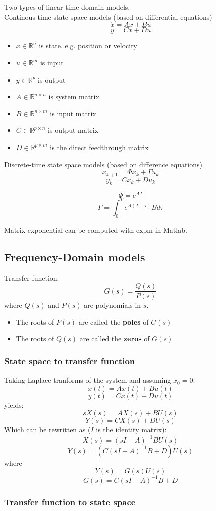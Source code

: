 Two types of linear time-domain models. \\
Continous-time state space models
(based on differential equations)
$$\dot{x} = Ax+Bu$$
$$y=Cx+Du$$
\begin{itemize}
	\item $x\in \mathbb{R}^n$ is state. e.g. position or velocity
	\item $u\in \mathbb{R}^m$ is input
	\item $y\in \mathbb{R}^p$ is output
	\item $A\in \mathbb{R}^{n\times n}$ is system matrix
	\item $B\in \mathbb{R}^{n\times m}$ is input matrix
	\item $C\in \mathbb{R}^{p\times n}$ is output matrix
	\item $D\in \mathbb{R}^{p\times m}$ is the direct feedthrough matrix
\end{itemize}
Discrete-time state space models (based on difference equations)
$$x_{k+1} = \Phi x_k + \Gamma u_k$$
$$y_k = Cx_k + Du_k$$

$$\Phi = e^{AT}$$
$$\Gamma = \int_0^T e^{A(T-\tau)}B d\tau$$

Matrix exponential can be computed with expm in Matlab.


\subsection{Frequency-Domain models}
Transfer function:
$$G(s)=\frac{Q(s)}{P(s)}$$
where $Q(s)$ and $P(s)$ are polynomials in $s$.
\begin{itemize}
	\item The roots of $P(s)$ are called the \textbf{poles} of $G(s)$
	\item The roots of $Q(s)$ are called the \textbf{zeros} of $G(s)$
\end{itemize}
\subsubsection{State space to transfer function}
Taking Laplace tranforms of the system and assuming $x_0=0$:
$$\dot{x}(t)=Ax(t)+Bu(t)$$
$$y(t)=Cx(t)+Du(t)$$
yields:
$$sX(s)=AX(s)+BU(s)$$
$$Y(s)=CX(s)+DU(s)$$
Which can be rewritten as ($I$ is the identity matrix):
$$X(s)=\left(sI-A\right)^{-1}BU(s)$$
$$Y(s)=\left(C\left(sI-A\right)^{-1}B+D\right)U(s)$$
where
$$Y(s)=G(s)U(s)$$
$$G(s)=C\left(sI-A\right)^{-1}B+D$$
\subsubsection{Transfer function to state space}


